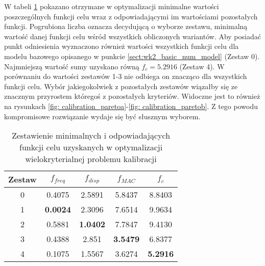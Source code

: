 W tabeli \ref{tab:minimal_values_calibration} pokazano otrzymane w optymalizacji minimalne wartości poszczególnych funkcji celu wraz z odpowiadającymi im wartościami pozostałych funkcji. Pogrubiona liczba oznacza decydującą o wyborze zestawu, minimalną wartość danej funkcji celu wśród wszystkich obliczonych wariantów. Aby posiadać punkt odniesienia wyznaczono również wartości wszystkich funkcji celu dla modelu bazowego opisanego w punkcie \ref{sect:wk2_basic_num_model} (Zestaw 0). Najmniejszą wartość sumy uzyskano równą $f_c=5.2916$ (Zestaw 4). W porównaniu do wartości zestawów 1-3 nie odbiega on znacząco dla wszystkich funkcji celu. Wybór jakiegokolwiek z pozostałych zestawów wiązałby się ze znacznym przyrostem któregoś z pozostałych kryteriów. Widoczne jest to również na rysunkach \ref{fig: calibration_paretoa}-\ref{fig: calibration_paretob}. Z tego powodu kompromisowe rozwiązanie wydaje się być słusznym wyborem. 

\begin{table}[]
	\small
	\caption{Zestawienie minimalnych i odpowiadających funkcji celu uzyskanych w optymalizacji wielokryterialnej problemu kalibracji}
	\centering
	\begin{tabular}{@{}ccccc@{}}
		
		\toprule
		Zestaw & \textbf{$f_{freq}$} & \textbf{$f_{disp}$} & \textbf{$f_{MAC}$} & \textbf{$f_{c}$} \\ \midrule
		0				& 0.4075			  & 2.5891				& 5.8437			 & 8.8403			\\ \midrule
		1               & \textbf{0.0024}     & 2.3096              & 7.6514             & 9.9634           \\ \midrule
		2               & 0.5881              & \textbf{1.0402}     & 7.7847             & 9.4130            \\ \midrule
		3               & 0.4388              & 2.851               & \textbf{3.5479}    & 6.8377           \\ \midrule
		4               & 0.1075              & 1.5567              & 3.6274             & \textbf{5.2916}  \\ \bottomrule
	\end{tabular}
	\label{tab:minimal_values_calibration}
\end{table}


